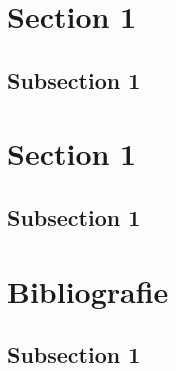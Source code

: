     \tableofcontents
    \newpage
    \section{Section 1}
    \subsection{Subsection 1}
    \newpage
    \section{Section 1}
    \subsection{Subsection 1}
    \newpage
    \section{Bibliografie}
    \subsection{Subsection 1}
    \newpage
% 